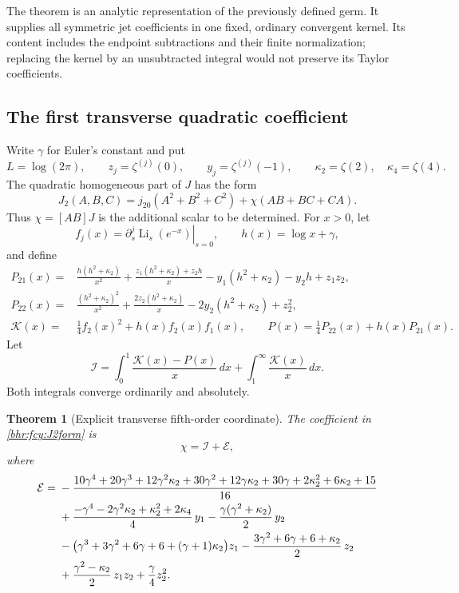 \documentclass[11pt]{article}
\numberwithin{equation}{section}
\theoremstyle{plain}
\newtheorem{theorem}{Theorem}[section]
\theoremstyle{definition}
\theoremstyle{remark}
\begin{document}
The theorem is an analytic representation of the previously defined
germ. It supplies all symmetric jet coefficients in one fixed,
ordinary convergent kernel. Its content includes the endpoint
subtractions and their finite normalization; replacing the kernel by
an unsubtracted integral would not preserve its Taylor coefficients.

\subsection{The first transverse quadratic coefficient}

Write \(\gamma\) for Euler's constant and put
\[
 L=\log(2\pi),\qquad z_j=\zeta^{(j)}(0),\qquad
 y_j=\zeta^{(j)}(-1),\qquad \kappa_2=\zeta(2),\quad \kappa_4=\zeta(4).
\]
The quadratic homogeneous part of \(J\) has the form
\begin{equation}\label{bhr:fcy:J2form}
 J_2(A,B,C)=j_{20}(A^2+B^2+C^2)+\chi(AB+BC+CA).
\end{equation}
Thus \(\chi=[AB]J\) is the additional scalar to be determined.
For \(x>0\), let
\[
 f_j(x)=\left.\partial_s^j\operatorname{Li}_s(e^{-x})\right|_{s=0},
 \qquad h(x)=\log x+\gamma,
\]
and define
\begin{align}
 P_{21}(x)={}&\frac{h(h^2+\kappa_2)}{x^2}
 +\frac{z_1(h^2+\kappa_2)+z_2h}{x}
 -y_1(h^2+\kappa_2)-y_2h+z_1z_2,
 \label{bhr:fcy:P21}\\
 P_{22}(x)={}&\frac{(h^2+\kappa_2)^2}{x^2}
 +\frac{2z_2(h^2+\kappa_2)}{x}-2y_2(h^2+\kappa_2)+z_2^2,
 \label{bhr:fcy:P22}\\
 \mathcal K(x)={}&\frac14 f_2(x)^2+h(x)f_2(x)f_1(x),\qquad
 P(x)=\frac14P_{22}(x)+h(x)P_{21}(x).
 \label{bhr:fcy:KP}
\end{align}
Let
\begin{equation}\label{bhr:fcy:chiintegral}
 \mathcal I=\int_0^1\frac{\mathcal K(x)-P(x)}x\,dx
                   +\int_1^\infty\frac{\mathcal K(x)}x\,dx.
\end{equation}
Both integrals converge ordinarily and absolutely.

\begin{theorem}[Explicit transverse fifth-order coordinate]
\label{bhr:fcy:chi}
The coefficient in \eqref{bhr:fcy:J2form} is
\begin{equation}\label{bhr:fcy:chiresult}
 \chi=\mathcal I+\mathcal E,
\end{equation}
where
\begin{align}
 \mathcal E={}&-\frac{10\gamma^4+20\gamma^3+12\gamma^2\kappa_2
 +30\gamma^2+12\gamma \kappa_2+30\gamma+2\kappa_2^2+6\kappa_2+15}{16}
 \notag\\
 &+\frac{-\gamma^4-2\gamma^2\kappa_2+\kappa_2^2+2\kappa_4}{4}\,y_1
 -\frac{\gamma(\gamma^2+\kappa_2)}2\,y_2\notag\\
 &-\bigl(\gamma^3+3\gamma^2+6\gamma+6+(\gamma+1)\kappa_2\bigr)z_1
 -\frac{3\gamma^2+6\gamma+6+\kappa_2}{2}\,z_2\notag\\
 &+\frac{\gamma^2-\kappa_2}{2}\,z_1z_2+\frac\gamma4z_2^2.
 \label{bhr:fcy:chicorrection}
\end{align}
\end{theorem}
\end{document}
